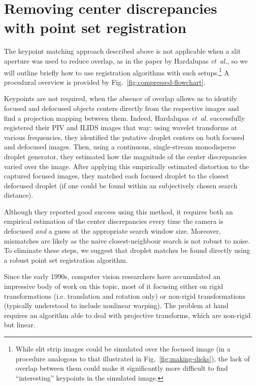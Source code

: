 \documentclass[11.5pt,oneside]{book}
\newcommand*{\figref}[1]{Fig.~\ref{#1}}
\begin{document}
\section{Removing center discrepancies with point set registration}
\label{sec:point-set-registration}
The keypoint matching approach described above is not applicable when a slit
aperture was used to reduce overlap, as in the paper by Hardalupas
\emph{et~al.}, so we will outline briefly how to use registration algorithms
with such setups.\footnote{While slit strip images could be
simulated over the focused image (in a procedure analogous to that illustrated
in \figref{fig:making-disks}), the lack of overlap between them could make it
significantly more difficult to find ``interesting'' keypoints in the simulated
image.} A procedural overview is provided by \figref{fig:compressed-flowchart}.

Keypoints are not required, when the absence of overlap allows
us to identify focused and defocused objects centers directly from the respective
images and find a projection mapping between them. Indeed, Hardalupas
\emph{et~al.} successfully registered their PIV and ILIDS images that way: using
wavelet transforms at various frequencies, they identified the putative droplet
centers on both focused and defocused images.  Then, using a continuous,
single-stream monodisperse droplet generator, they estimated how the magnitude
of the center discrepancies varied over the image.  After applying this
empirically estimated distortion to the captured focused images, they matched each
focused droplet to the closest defocused droplet (if one could be found within an
subjectively chosen search distance).

Although they reported good success using this method, it requires both an
empirical estimation of the center discrepancies every time the camera is
defocused \emph{and} a guess at the appropriate search window size. Moreover,
mismatches are likely as the naive closest-neighbour search is not robust to
noise. To eliminate these steps, we suggest that droplet matches be found
directly using a robust point set registration algorithm.

Since the early 1990s, computer vision researchers have accumulated an
impressive body of work on this topic, most of it focusing either
on rigid transformations (i.e. translation and rotation only) or non-rigid
transformations (typically understood to include nonlinear warping). The problem
at hand requires an algorithm able to deal with projective transforms, which
are non-rigid but linear.
\end{document}
